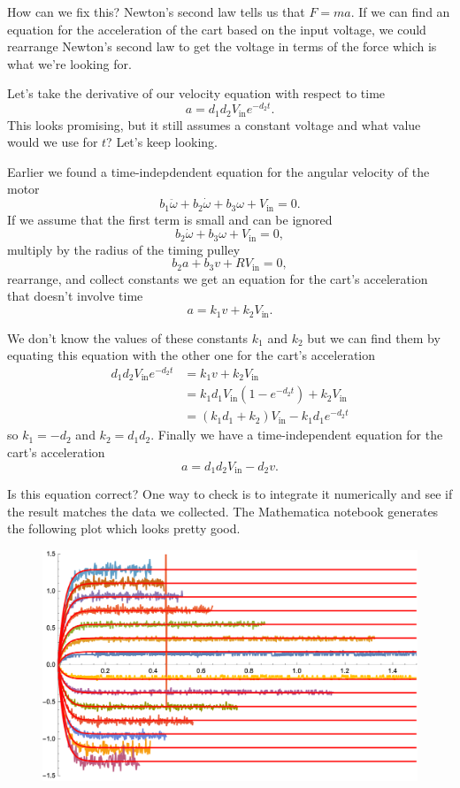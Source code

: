 \documentclass{article}
\begin{document}
How can we fix this? Newton's second law tells us that $F = m a$. If we can find an equation for the acceleration of the cart based on the input voltage, we could rearrange Newton's second law to get the voltage in terms of the force which is what we're looking for.

Let's take the derivative of our velocity equation with respect to time \[a = d_1 d_2 V_\text{in} e^{-d_2 t}.\] This looks promising, but it still assumes a constant voltage and what value would we use for $t$? Let's keep looking.

Earlier we found a time-indepdendent equation for the angular velocity of the motor \[b_1 \ddot{\omega} + b_2 \dot{\omega} + b_3 \omega + V_\text{in} = 0.\] If we assume that the first term is small and can be ignored \[b_2 \dot{\omega} + b_3 \omega + V_\text{in} = 0,\] multiply by the radius of the timing pulley \[b_2 a + b_3 v + R V_\text{in} = 0,\] rearrange, and collect constants we get an equation for the cart's acceleration that doesn't involve time \[a = k_1 v + k_2 V_\text{in}.\]

We don't know the values of these constants $k_1$ and $k_2$ but we can find them by equating this equation with the other one for the cart's acceleration \begin{align*}
  d_1 d_2 V_\text{in} e^{-d_2 t} & = k_1 v + k_2 V_\text{in}                                \\
                                 & = k_1 d_1 V_\text{in} (1 - e^{-d_2 t}) + k_2 V_\text{in} \\
                                 & = (k_1 d_1 + k_2) V_\text{in} - k_1 d_1 e^{-d_2 t}
\end{align*} so $k_1 = -d_2$ and $k_2 = d_1 d_2$. Finally we have a time-independent equation for the cart's acceleration \[a = d_1 d_2 V_\text{in} - d_2 v.\]

Is this equation correct? One way to check is to integrate it numerically and see if the result matches the data we collected. The Mathematica notebook generates the following plot which looks pretty good.

\begin{figure}[H]
  \centering
  \includegraphics[width=\textwidth]{velocities_fitted_2}
\end{figure}
\end{document}
